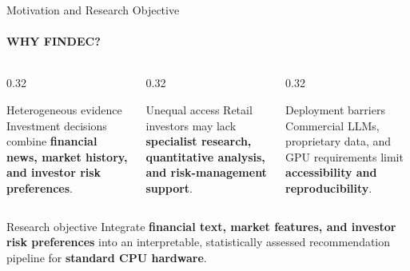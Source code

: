 \documentclass[aspectratio=169,11pt]{beamer}
\newcommand{\keyphrase}[1]{\textbf{\color{DELCONred}#1}}
\begin{document}
\begin{frame}{Motivation and Research Objective}
  \framesubtitle{WHY FINDEC?}
  \begin{columns}[T,onlytextwidth]
    \begin{column}{0.32\textwidth}
      \begin{block}{Heterogeneous evidence}
        \small Investment decisions combine \keyphrase{financial news, market history, and investor risk preferences}.
      \end{block}
    \end{column}
    \begin{column}{0.32\textwidth}
      \begin{block}{Unequal access}
        \small Retail investors may lack \keyphrase{specialist research, quantitative analysis, and risk-management support}.
      \end{block}
    \end{column}
    \begin{column}{0.32\textwidth}
      \begin{block}{Deployment barriers}
        \small Commercial LLMs, proprietary data, and GPU requirements limit \keyphrase{accessibility and reproducibility}.
      \end{block}
    \end{column}
  \end{columns}
  \vspace{0.10cm}
  \begin{alertblock}{Research objective}
    Integrate \keyphrase{financial text, market features, and investor risk preferences} into an interpretable, statistically assessed recommendation pipeline for \keyphrase{standard CPU hardware}.
  \end{alertblock}
\end{frame}
\end{document}
